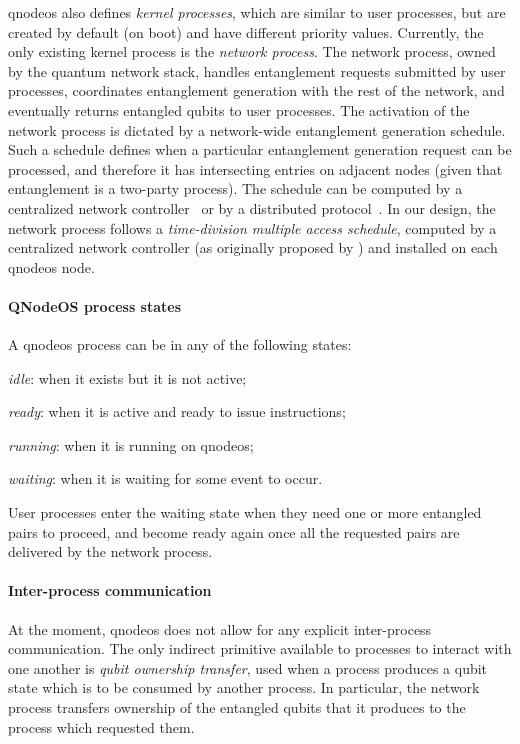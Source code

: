 \acrshort{qnodeos} also defines \emph{kernel processes}, which are similar to user processes, but
are created by default (on boot) and have different priority values. Currently, the only existing
kernel process is the \emph{network process}. The network process, owned by the quantum network
stack, handles entanglement requests submitted by user processes, coordinates entanglement
generation with the rest of the network, and eventually returns entangled qubits to user processes.
The activation of the network process is dictated by a network-wide entanglement generation
schedule. Such a schedule defines when a particular entanglement generation request can be
processed, and therefore it has intersecting entries on adjacent nodes (given that entanglement is a
two-party process). The schedule can be computed by a centralized network
controller~\cite{skrzypczyk_2021_arch} or by a distributed protocol~\cite{dahlberg_2019_egp}. In our
design, the network process follows a \emph{time-division multiple access schedule}, computed by a
centralized network controller (as originally proposed by \textcite{skrzypczyk_2021_arch}) and
installed on each \acrshort{qnodeos} node.

\paragraph{QNodeOS process states}

A \acrshort{qnodeos} process can be in any of the following states:
%
\begin{inlinelist}
    \item \emph{idle}: when it exists but it is not active;
    \item \emph{ready}: when it is active and ready to issue instructions;
    \item \emph{running}: when it is running on \acrshort{qnodeos};
    \item \emph{waiting}: when it is waiting for some event to occur.
\end{inlinelist}
User processes enter the waiting state when they need one or more entangled pairs to proceed, and
become ready again once all the requested pairs are delivered by the network process.

\paragraph{Inter-process communication}

At the moment, \acrshort{qnodeos} does not allow for any explicit inter-process communication. The
only indirect primitive available to processes to interact with one another is \emph{qubit ownership
transfer}, used when a process produces a qubit state which is to be consumed by another process. In
particular, the network process transfers ownership of the entangled qubits that it produces to the
process which requested them.

